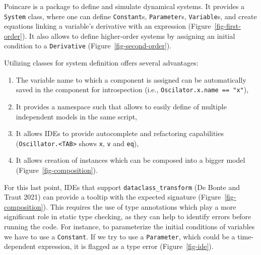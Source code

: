\documentclass[
  letterpaper,
  DIV=11,
  numbers=noendperiod]{scrartcl}
\providecommand{\tightlist}{%
  \setlength{\itemsep}{0pt}\setlength{\parskip}{0pt}}\usepackage{longtable,booktabs,array}
\begin{document}
Poincare is a package to define and simulate dynamical systems. It
provides a \texttt{System} class, where one can define
\texttt{Constant}s, \texttt{Parameter}s, \texttt{Variable}s, and create
equations linking a variable's derivative with an expression
(Figure~\ref{fig-first-order}). It also allows to define higher-order
systems by assigning an initial condition to a \texttt{Derivative}
(Figure~\ref{fig-second-order}).

Utilizing classes for system definition offers several advantages:

\begin{enumerate}
\def\labelenumi{\arabic{enumi}.}
\tightlist
\item
  The variable name to which a component is assigned can be
  automatically saved in the component for introspection (i.e.,
  \texttt{Oscilator.x.name\ ==\ "x"}),
\item
  It provides a namespace such that allows to easily define of multiple
  independent models in the same script,
\item
  It allows IDEs to provide autocomplete and refactoring capabilities
  (\texttt{Oscillator.\textless{}TAB\textgreater{}} shows \texttt{x},
  \texttt{v} and \texttt{eq}),
\item
  It allows creation of instances which can be composed into a bigger
  model (Figure~\ref{fig-composition}).
\end{enumerate}

For this last point, IDEs that support \texttt{dataclass\_transform} (De
Bonte and Traut 2021) can provide a tooltip with the expected signature
(Figure~\ref{fig-composition}). This requires the use of type
annotations which play a more significant role in static type checking,
as they can help to identify errors before running the code. For
instance, to parameterize the initial conditions of variables we have to
use a \texttt{Constant}. If we try to use a \texttt{Parameter}, which
could be a time-dependent expression, it is flagged as a type error
(Figure~\ref{fig-ide}).
\end{document}
